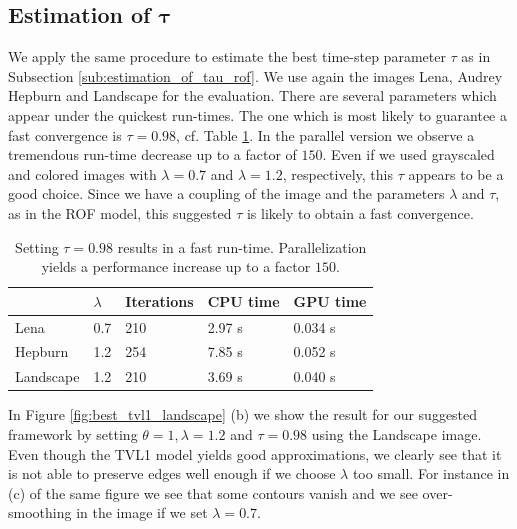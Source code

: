 \documentclass[abstracton]{scrreprt}
\begin{document}
        \subsection{Estimation of $\boldsymbol{\tau}$} %
        \label{sub:estimation_of_tau_tvl1}
            
            We apply the same procedure to estimate the best time-step parameter $\tau$ as in Subsection \ref{sub:estimation_of_tau_rof}. We use again the images Lena, Audrey Hepburn and Landscape for the evaluation. There are several parameters which appear under the quickest run-times. The one which is most likely to guarantee a fast convergence is $\tau = 0.98$, cf. Table \ref{tab:tvl1_cpu_vs_gpu}. In the parallel version we observe a tremendous run-time decrease up to a factor of $150$. Even if we used grayscaled and colored images with $\lambda = 0.7$ and $\lambda = 1.2$, respectively, this $\tau$ appears to be a good choice. Since we have a coupling of the image and the parameters $\lambda$ and $\tau$, as in the ROF model, this suggested $\tau$ is likely to obtain a fast convergence.
            \begin{table}[!ht]
                \centering
                \begin{tabular}{| l || l | l | l | l |}
                    \hline
                    & $\lambda$ & Iterations & CPU time & GPU time \\ \hline
                    Lena & 0.7 & 210 & 2.97 s & 0.034 s \\ \hline
                    Hepburn & 1.2 & 254 & 7.85 s & 0.052 s \\ \hline
                    Landscape & 1.2 & 210 & 3.69 s & 0.040 s \\ \hline
                \end{tabular}
                \caption[Run-times for best parameters in TVL1 model.]{Setting $\tau = 0.98$ results in a fast run-time. Parallelization yields a performance increase up to a factor $150$.}
                \label{tab:tvl1_cpu_vs_gpu}
            \end{table}
            In Figure \ref{fig:best_tvl1_landscape} (b) we show the result for our suggested framework by setting $\theta = 1, \lambda = 1.2$ and $\tau = 0.98$ using the Landscape image. Even though the TVL1 model yields good approximations, we clearly see that it is not able to preserve edges well enough if we choose $\lambda$ too small. For instance in (c) of the same figure we see that some contours vanish and we see over-smoothing in the image if we set $\lambda = 0.7$.\\
\end{document}
